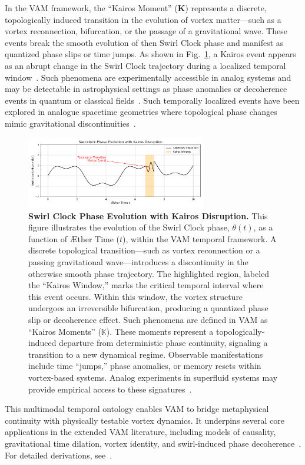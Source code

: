 In the VAM framework, the “Kairos Moment” ($\mathbb{\boldsymbol{K}}$) represents a discrete, topologically induced transition in the evolution of vortex matter—such as a vortex reconnection, bifurcation, or the passage of a gravitational wave. These events break the smooth evolution of then Swirl Clock phase and manifest as quantized phase slips or time jumps. As shown in Fig.~\ref{fig:kairos_moment}, a Kairos event appears as an abrupt change in the Swirl Clock trajectory during a localized temporal window~\cite{buhler2005wave}. Such phenomena are experimentally accessible in analog systems and may be detectable in astrophysical settings as phase anomalies or decoherence events in quantum or classical fields~\cite{VAM-13, VAM-15}. Such temporally localized events have been explored in analogue spacetime geometries where topological phase changes mimic gravitational discontinuities~\cite{barcelo2005}.


\begin{figure}[htb]
    \centering
    \includegraphics[width=0.7\textwidth]{figures/TemporalOntologyKairosMoment}
    \caption{
        \textbf{Swirl Clock Phase Evolution with Kairos Disruption.}
        This figure illustrates the evolution of the Swirl Clock phase, \(\theta(t)\), as a function of Æther Time (\(t
        \)), within the VAM temporal framework. A discrete topological transition—such as vortex reconnection or a passing gravitational wave—introduces a discontinuity in the otherwise smooth phase trajectory.
        The highlighted region, labeled the “Kairos Window,” marks the critical temporal interval where this event occurs. Within this window, the
    vortex structure undergoes an irreversible bifurcation, producing a quantized phase slip or decoherence effect. Such phenomena are defined in VAM as “Kairos Moments” (\(\mathbb{{K}}\)).
        These moments represent a topologically-induced departure from deterministic phase continuity, signaling a transition to a new dynamical regime. Observable manifestations include time “jumps,” phase anomalies, or memory resets within vortex-based systems. Analog experiments in superfluid systems may provide empirical access to these signatures~\cite{VAM-13, VAM-15}.
    }
    \label{fig:kairos_moment}
\end{figure}

This multimodal temporal ontology enables VAM to bridge metaphysical continuity with physically testable vortex dynamics. It underpins several core applications in the extended VAM literature, including models of causality, gravitational time dilation, vortex identity, and swirl-induced phase decoherence~\cite{VAM-1, VAM-2, VAM-8, VAM-13, VAM-15}. For detailed derivations, see~\cite{VAM-2, VAM-8, VAM-13, VAM-15}.
